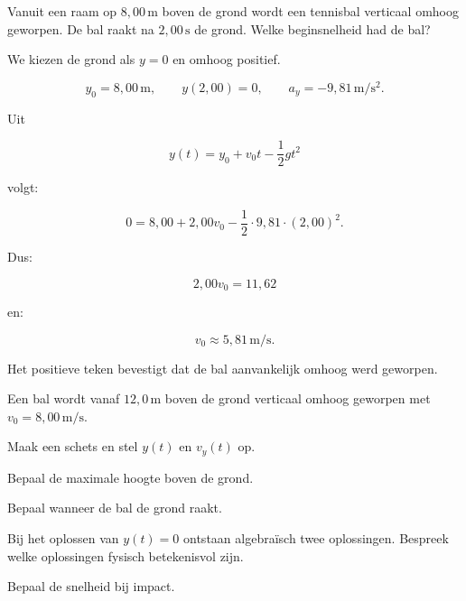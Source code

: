 \documentclass{ximera}
\begin{document}
\begin{voorbeeld}

Vanuit een raam op $8,00\,\mathrm{m}$ boven de grond wordt een
tennisbal verticaal omhoog geworpen. De bal raakt na
$2,00\,\mathrm{s}$ de grond. Welke beginsnelheid had de bal?

We kiezen de grond als $y=0$ en omhoog positief.

\[
y_0=8,00\,\mathrm{m},
\qquad
y(2,00)=0,
\qquad
a_y=-9,81\,\mathrm{m/s^2}.
\]

Uit

\[
y(t)=y_0+v_0t-\frac12gt^2
\]

volgt:

\[
0
=
8,00+2,00v_0
-\frac12\cdot9,81\cdot(2,00)^2.
\]

Dus:

\[
2,00v_0=11,62
\]

en:

\[
\boxed{
v_0\approx5,81\,\mathrm{m/s}.
}
\]

Het positieve teken bevestigt dat de bal aanvankelijk omhoog werd
geworpen.

\end{voorbeeld}


\begin{oefening}{\oefU\ESS}

Een bal wordt vanaf $12,0\,\mathrm{m}$ boven de grond verticaal omhoog
geworpen met $v_0=8,00\,\mathrm{m/s}$.

\begin{question}
Maak een schets en stel $y(t)$ en $v_y(t)$ op.
\end{question}

\begin{question}
Bepaal de maximale hoogte boven de grond.
\end{question}

\begin{question}
Bepaal wanneer de bal de grond raakt.
\end{question}

\begin{question}
Bij het oplossen van $y(t)=0$ ontstaan algebraïsch twee oplossingen.
Bespreek welke oplossingen fysisch betekenisvol zijn.
\end{question}

\begin{question}
Bepaal de snelheid bij impact.
\end{question}

\end{oefening}
\end{document}
